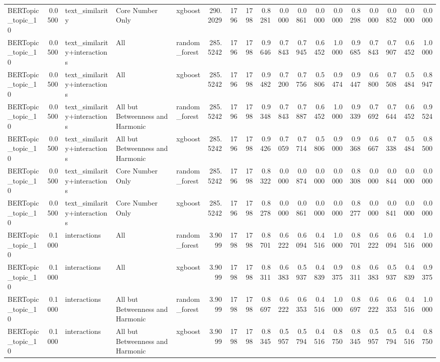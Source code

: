 \begin{tabular}{lrlllrrrrrrrrrrrrr}
BERTopic_topic_10 & 0.0500 & text_similarity & Core Number Only & xgboost & 290.2029 & 1796 & 1798 & 0.8281 & 0.0000 & 0.0861 & 0.0000 & 0.0000 & 0.8298 & 0.0000 & 0.0852 & 0.0000 & 0.0000 \\
BERTopic_topic_10 & 0.0500 & text_similarity+interactions & All & random_forest & 285.5242 & 1796 & 1798 & 0.9646 & 0.7843 & 0.7945 & 0.6452 & 1.0000 & 0.9685 & 0.7843 & 0.7907 & 0.6452 & 1.0000 \\
BERTopic_topic_10 & 0.0500 & text_similarity+interactions & All & xgboost & 285.5242 & 1796 & 1798 & 0.9482 & 0.7200 & 0.7756 & 0.5806 & 0.9474 & 0.9447 & 0.6800 & 0.7508 & 0.5484 & 0.8947 \\
BERTopic_topic_10 & 0.0500 & text_similarity+interactions & All but Betweenness and Harmonic & random_forest & 285.5242 & 1796 & 1798 & 0.9348 & 0.7843 & 0.7887 & 0.6452 & 1.0000 & 0.9339 & 0.7692 & 0.7644 & 0.6452 & 0.9524 \\
BERTopic_topic_10 & 0.0500 & text_similarity+interactions & All but Betweenness and Harmonic & xgboost & 285.5242 & 1796 & 1798 & 0.9426 & 0.7059 & 0.7714 & 0.5806 & 0.9000 & 0.9368 & 0.6667 & 0.7338 & 0.5484 & 0.8500 \\
BERTopic_topic_10 & 0.0500 & text_similarity+interactions & Core Number Only & random_forest & 285.5242 & 1796 & 1798 & 0.8322 & 0.0000 & 0.0874 & 0.0000 & 0.0000 & 0.8308 & 0.0000 & 0.0844 & 0.0000 & 0.0000 \\
BERTopic_topic_10 & 0.0500 & text_similarity+interactions & Core Number Only & xgboost & 285.5242 & 1796 & 1798 & 0.8278 & 0.0000 & 0.0861 & 0.0000 & 0.0000 & 0.8277 & 0.0000 & 0.0841 & 0.0000 & 0.0000 \\
BERTopic_topic_10 & 0.1000 & interactions & All & random_forest & 3.9099 & 1798 & 1798 & 0.8701 & 0.6222 & 0.6094 & 0.4516 & 1.0000 & 0.8701 & 0.6222 & 0.6094 & 0.4516 & 1.0000 \\
BERTopic_topic_10 & 0.1000 & interactions & All & xgboost & 3.9099 & 1798 & 1798 & 0.8311 & 0.6383 & 0.5937 & 0.4839 & 0.9375 & 0.8311 & 0.6383 & 0.5937 & 0.4839 & 0.9375 \\
BERTopic_topic_10 & 0.1000 & interactions & All but Betweenness and Harmonic & random_forest & 3.9099 & 1798 & 1798 & 0.8697 & 0.6222 & 0.6353 & 0.4516 & 1.0000 & 0.8697 & 0.6222 & 0.6353 & 0.4516 & 1.0000 \\
BERTopic_topic_10 & 0.1000 & interactions & All but Betweenness and Harmonic & xgboost & 3.9099 & 1798 & 1798 & 0.8345 & 0.5957 & 0.5794 & 0.4516 & 0.8750 & 0.8345 & 0.5957 & 0.5794 & 0.4516 & 0.8750 \\

\end{tabular}
